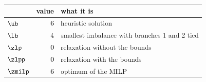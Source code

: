 \begin{center}\small
\begin{tabular}{lrl}
\toprule
 & value & what it is \\
\midrule
$\ub$ & $6$ & heuristic solution \\
$\lb$ & $4$ & smallest imbalance with branches 1 and 2 tied \\
$\zlp$ & $0$ & relaxation without the bounds \\
$\zlpp$ & $0$ & relaxation with the bounds \\
$\zmilp$ & $6$ & optimum of the MILP \\
\bottomrule
\end{tabular}
\end{center}
